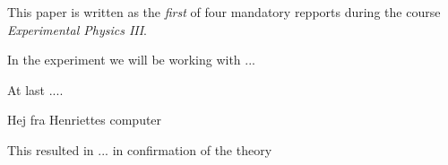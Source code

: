 This paper is written as the \emph{first} of four mandatory repports
during the course \emph{Experimental Physics III}.

In the experiment we will be working with ... 

At last ....

Hej fra Henriettes computer


This resulted in ...
in confirmation of the theory
